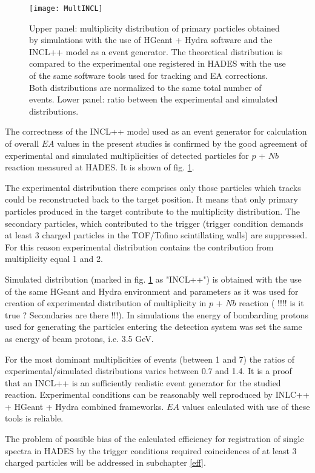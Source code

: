     \begin{figure}
	\centering
	\texttt{[image: MultINCL]}
	\caption{Upper panel: multiplicity distribution of primary particles obtained by simulations with the use of HGeant + Hydra software and the INCL++ model as a event generator.
	The theoretical distribution is compared to the experimental one registered in HADES with the use of the same software tools used for tracking and EA corrections. 
	Both distributions are normalized to the same total number of events. Lower panel: ratio between the experimental and simulated distributions.}
	\label{MultINCL}
    \end{figure}

The correctness of the INCL++ model used as an event generator for calculation of overall $EA$ values in the present studies is confirmed by the good agreement of experimental and simulated multiplicities of detected particles for $p$ + $Nb$ reaction measured at HADES. It is shown of fig. \ref{MultINCL}.  

The experimental distribution there comprises only those particles 
which tracks could be reconstructed back to the target position.  
It means that only primary particles produced in the target contribute to the multiplicity distribution. The secondary particles, which contributed to the trigger (trigger condition demands at least 3 charged particles in the TOF/Tofino 
scintillating walls) are suppressed. For this reason experimental distribution contains the contribution from multiplicity equal 1 and 2. 

Simulated distribution (marked in fig. \ref{MultINCL} as "INCL++")
is obtained with the use of the same HGeant and Hydra environment and parameters as it was used for creation of experimental distribution of multiplicity in $p$ + $Nb$ reaction ( !!!! is it true ? Secondaries are there !!!). In simulations the energy of bombarding protons used for generating the particles entering the detection system was set the same as energy of beam protons, i.e. 3.5 GeV.  

For the most dominant multiplicities of events (between 1 and 7) 
the ratios of experimental/simulated distributions varies between 0.7 and 1.4. It is a proof that an INCL++ is an sufficiently realistic event generator for the studied reaction. Experimental conditions can be reasonably well reproduced by INLC++ + HGeant + Hydra combined frameworks. $EA$ values calculated with use of these 
tools is reliable.  

The problem of possible bias of the calculated efficiency for registration of single spectra in HADES by the trigger conditions required coincidences of at least 3 charged particles will be addressed in subchapter \ref{eff}.   

